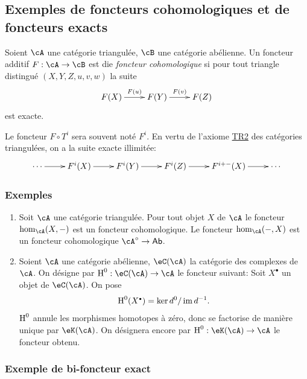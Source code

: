 \subsection{Exemples de foncteurs cohomologiques et de foncteurs exacts}\label{VIII:1-3}





\begin{definition}
Soient $\cA$ une catégorie triangulée, $\cB$ une catégorie abélienne. 
Un foncteur additif $F:\cA\to \cB$ est die \emph{foncteur cohomologique} si 
pour tout triangle distingué $(X,Y,Z,u,v,w)$ la suite 
\[\xymatrix{
  F(X) \ar[r]^-{F(u)} 
    & F(Y) \ar[r]^-{F(v)} 
    & F(Z) 
}\]
est exacte. 
\end{definition}

Le foncteur $F\circ T^i$ sera souvent noté $F^i$. En vertu de l'axiome 
\hyperlink{VIII:TR2}{TR2} des catégories triangulées, on a la suite 
exacte illimitée: 
\[\xymatrix{
  \cdots \ar[r] 
    & F^i(X) \ar[r] 
    & F^i(Y) \ar[r] 
    & F^i(Z) \ar[r] 
    & F^{i+-}(X) \ar[r] 
    & \cdots 
}\]





\subsubsection{Exemples}\label{VIII:1-3-2}

\begin{enumerate}
  \item Soit $\cA$ une catégorie triangulée. Pour tout objet $X$ de $\cA$ 
    le foncteur $\hom_\cA(X,-)$ est un foncteur cohomologique. Le foncteur 
    $\hom_\cA(-,X)$ est un foncteur cohomologique $\cA^\circ\to\mathsf{Ab}$. 
  \item Soient $\cA$ une catégorie abélienne, $\eC(\cA)$ la catégorie des 
    complexes de $\cA$. On désigne par $\h^0:\eC(\cA)\to\cA$ le foncteur 
    suivant: Soit $X^\bullet$ un objet de $\eC(\cA)$. On pose 
    \[
      \h^0(X^\bullet) = \ker d^0 / \im{d^{-1}} \text{.}
    \]
    $\operatorname{H}^0$ annule les morphismes homotopes à zéro, donc se factorise de 
    manière unique par $\eK(\cA)$. On désignera encore par 
    $\h^0:\eK(\cA) \to \cA$ le foncteur obtenu. 
\end{enumerate}





\subsubsection{Exemple de bi-foncteur exact}\label{VIII:1-3-3}

